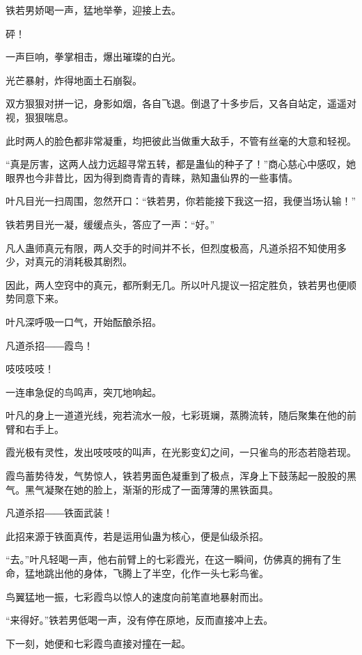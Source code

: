 
\begin{this_body}

铁若男娇喝一声，猛地举拳，迎接上去。

砰！

一声巨响，拳掌相击，爆出璀璨的白光。

光芒暴射，炸得地面土石崩裂。

双方狠狠对拼一记，身影如烟，各自飞退。倒退了十多步后，又各自站定，遥遥对视，狠狠喘息。

此时两人的脸色都非常凝重，均把彼此当做重大敌手，不管有丝毫的大意和轻视。

“真是厉害，这两人战力远超寻常五转，都是蛊仙的种子了！”商心慈心中感叹，她眼界也今非昔比，因为得到商青青的青睐，熟知蛊仙界的一些事情。

叶凡目光一扫周围，忽然开口：“铁若男，你若能接下我这一招，我便当场认输！”

铁若男目光一凝，缓缓点头，答应了一声：“好。”

凡人蛊师真元有限，两人交手的时间并不长，但烈度极高，凡道杀招不知使用多少，对真元的消耗极其剧烈。

因此，两人空窍中的真元，都所剩无几。所以叶凡提议一招定胜负，铁若男也便顺势同意下来。

叶凡深呼吸一口气，开始酝酿杀招。

凡道杀招――霞鸟！

吱吱吱吱！

一连串急促的鸟鸣声，突兀地响起。

叶凡的身上一道道光线，宛若流水一般，七彩斑斓，蒸腾流转，随后聚集在他的前臂和右手上。

霞光极有灵性，发出吱吱吱的叫声，在光影变幻之间，一只雀鸟的形态若隐若现。

霞鸟蓄势待发，气势惊人，铁若男面色凝重到了极点，浑身上下鼓荡起一股股的黑气。黑气凝聚在她的脸上，渐渐的形成了一面薄薄的黑铁面具。

凡道杀招――铁面武装！

此招来源于铁面真传，若是运用仙蛊为核心，便是仙级杀招。

“去。”叶凡轻喝一声，他右前臂上的七彩霞光，在这一瞬间，仿佛真的拥有了生命，猛地跳出他的身体，飞腾上了半空，化作一头七彩鸟雀。

鸟翼猛地一振，七彩霞鸟以惊人的速度向前笔直地暴射而出。

“来得好。”铁若男低喝一声，没有停在原地，反而直接冲上去。

下一刻，她便和七彩霞鸟直接对撞在一起。


\end{this_body}
